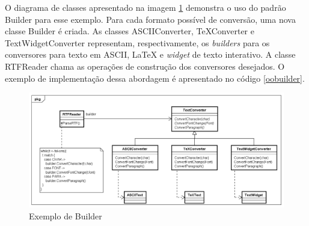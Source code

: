 O diagrama de classes apresentado na imagem 
\ref{builder_exemplo} demonstra o uso do padrão 
Builder para esse exemplo. Para cada formato possível 
de conversão, uma nova classe Builder é criada. 
As classes ASCIIConverter, TeXConverter e 
TextWidgetConverter representam, respectivamente, 
os \textit{builders} para os conversores para texto 
em ASCII, LaTeX e \textit{widget} de texto interativo. 
A classe RTFReader chama as operações de construção 
dos conversores desejados. O exemplo de 
implementação dessa abordagem é apresentado no 
código \ref{oobuilder}.

\begin{figure}[htb]
	\caption{\label{builder_exemplo}Exemplo de Builder}
	\begin{center}
	    \includegraphics[scale=0.5]{5_padroes-contexto-funcional/5.1_criacionais/5.1.3_builder/builder_exemplo.png}
	\end{center}
\end{figure}

